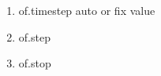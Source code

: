 \documentclass[letterpaper,10pt,english]{sphinxmanual}
\begin{document}
\begin{sphinxVerbatim}[commandchars=\\\{\}]
 
\end{sphinxVerbatim}
\begin{enumerate}
%
\item {} 
of.timestep auto or fix value

\item {} 
of.step

\item {} 
of.stop

\end{enumerate}



\renewcommand{\indexname}{Index}
\printindex
\end{document}
